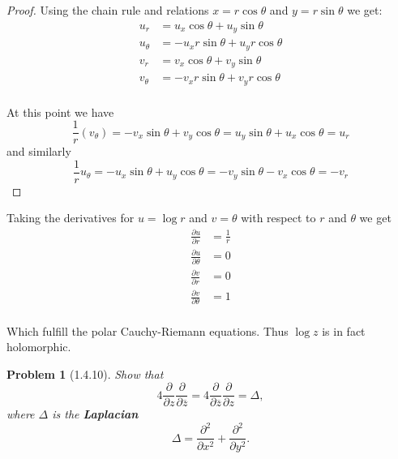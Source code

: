 \documentclass[10pt]{article}
\newcommand{\sk}{\vskip 10mm}
\newcommand{\conj}[1]{\overline{#1}}
\theoremstyle{plain}
\newtheorem{problem}{Problem}
\theoremstyle{remark}
\begin{document}
\begin{proof}
  Using the chain rule and relations $x=r\cos\theta$ and $y=r\sin\theta$ we get:
  \begin{align*}
    u_r &= u_x\cos\theta+u_y\sin\theta\\
    u_\theta &= -u_xr\sin\theta+u_yr\cos\theta\\
    v_r &= v_x\cos\theta+v_y\sin\theta\\
    v_\theta &= -v_xr\sin\theta+v_yr\cos\theta\\
  \end{align*}

  At this point we have
  \[
    \frac{1}{r}(v_\theta)=-v_x\sin\theta+v_y\cos\theta=u_y\sin\theta+u_x\cos\theta=u_r
  \]
  and similarly
  \[
    \frac{1}{r}u_\theta = -u_x\sin\theta+u_y\cos\theta = -v_y\sin\theta-v_x\cos\theta=-v_r
  \]
\end{proof}

Taking the derivatives for $u=\log r$ and $v=\theta$ with respect to $r$ and $\theta$ we get
\begin{align*}
  \frac{\partial u}{\partial r} &= \frac{1}{r}\\
  \frac{\partial u}{\partial\theta} &= 0\\
  \frac{\partial v}{\partial r} &= 0\\
  \frac{\partial v}{\partial\theta} &= 1\\
\end{align*}

Which fulfill the polar Cauchy-Riemann equations. Thus $\log z$ is in fact
holomorphic.

\sk

\begin{problem}[1.4.10]
  Show that
  \[
    4\frac{\partial}{\partial z}\frac{\partial}{\partial \conj{z}}=4\frac{\partial}{\partial\conj{z}}\frac{\partial}{\partial z}=\Delta,
  \]
  where $\Delta$ is the \textbf{Laplacian}
  \[
    \Delta = \frac{\partial^2}{\partial x^2}+\frac{\partial^2}{\partial y^2}.
  \]
\end{problem}
\end{document}
